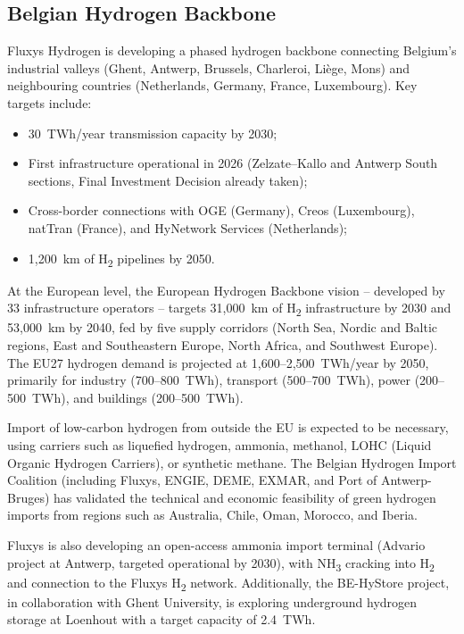\subsection{Belgian Hydrogen Backbone}

Fluxys Hydrogen is developing a phased hydrogen backbone connecting Belgium's industrial valleys (Ghent, Antwerp, Brussels, Charleroi, Liège, Mons) and neighbouring countries (Netherlands, Germany, France, Luxembourg). Key targets include:
\begin{itemize}[noitemsep]
    \item 30~TWh/year transmission capacity by 2030;
    \item First infrastructure operational in 2026 (Zelzate--Kallo and Antwerp South sections, Final Investment Decision already taken);
    \item Cross-border connections with OGE (Germany), Creos (Luxembourg), natTran (France), and HyNetwork Services (Netherlands);
    \item 1,200~km of H\textsubscript{2} pipelines by 2050.
\end{itemize}

At the European level, the European Hydrogen Backbone vision -- developed by 33 infrastructure operators -- targets 31,000~km of H\textsubscript{2} infrastructure by 2030 and 53,000~km by 2040, fed by five supply corridors (North Sea, Nordic and Baltic regions, East and Southeastern Europe, North Africa, and Southwest Europe). The EU27 hydrogen demand is projected at 1,600--2,500~TWh/year by 2050, primarily for industry (700--800~TWh), transport (500--700~TWh), power (200--500~TWh), and buildings (200--500~TWh).

Import of low-carbon hydrogen from outside the EU is expected to be necessary, using carriers such as liquefied hydrogen, ammonia, methanol, LOHC (Liquid Organic Hydrogen Carriers), or synthetic methane. The Belgian Hydrogen Import Coalition (including Fluxys, ENGIE, DEME, EXMAR, and Port of Antwerp-Bruges) has validated the technical and economic feasibility of green hydrogen imports from regions such as Australia, Chile, Oman, Morocco, and Iberia.

Fluxys is also developing an open-access ammonia import terminal (Advario project at Antwerp, targeted operational by 2030), with NH\textsubscript{3} cracking into H\textsubscript{2} and connection to the Fluxys H\textsubscript{2} network. Additionally, the BE-HyStore project, in collaboration with Ghent University, is exploring underground hydrogen storage at Loenhout with a target capacity of 2.4~TWh.

